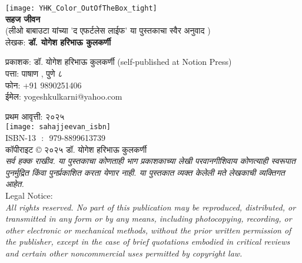 \thispagestyle{empty}

\begin{center}
\texttt{[image: YHK\_Color\_OutOfTheBox\_tight]} \\[1.5em]

\textbf{\Huge सहज जीवन}\\ [0.5em]
{\small(लीओ बाबाउटा यांच्या 'द एफर्टलेस लाईफ' या पुस्तकाचा स्वैर अनुवाद )}\\[0.5em]

लेखक: \textbf{{\large डॉ. योगेश हरिभाऊ कुलकर्णी}}\\[1.5em]
\end{center}

\vspace{1.5em}

\begin{flushleft}

प्रकाशक: डॉ. योगेश हरिभाऊ कुलकर्णी (self-published at Notion Press)\\
पत्ता:  पाषाण ,  पुणे ८ \\
फोन:  +91 9890251406\\
ईमेल: yogeshkulkarni@yahoo.com\\[1.5em]

\vspace{0.5em}

प्रथम आवृत्ती: २०२५\\[0.5em]

\texttt{[image: sahajjeevan\_isbn]} \\ [0.5em]
ISBN-13 ‏ : ‎ 979-8899613739\\[1.5em]

कॉपीराइट © २०२५ डॉ. योगेश हरिभाऊ कुलकर्णी\\[0.5em]

{\textit{सर्व हक्क राखीव. या पुस्तकाचा कोणताही भाग प्रकाशकाच्या लेखी परवानगीशिवाय कोणत्याही स्वरूपात पुनर्मुद्रित किंवा पुनर्प्रकाशित करता येणार नाही.  या पुस्तकात व्यक्त केलेली मते लेखकाची व्यक्तिगत आहेत.}}\\[1.5em]

{\large Legal Notice:}\\
{\textit{All rights reserved. No part of this publication may be reproduced, distributed, or transmitted in any form or by any means, including photocopying, recording, or other electronic or mechanical methods, without the prior written permission of the publisher, except in the case of brief quotations embodied in critical reviews and certain other noncommercial uses permitted by copyright law.}}
\end{flushleft}
\vfill\null
\clearpage


